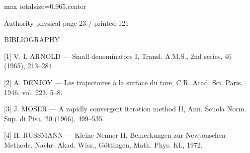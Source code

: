 \documentclass{article}
\begin{document}
\newpage
\noindent\begin{adjustbox}{max totalsize={\textwidth}{0.965\textheight},center}\begin{minipage}{\textwidth}
\noindent\hfill\scriptsize Authority physical page 23 / printed 121\par\normalsize
BIBLIOGRAPHY

[1] V. I. ARNOLD — Small denominators I, Transl. A.M.S., 2nd series, 46 (1965), 213–284.

[2] A. DENJOY — Les trajectoires à la surface du tore, C.R. Acad. Sci. Paris, 1946, vol. 223, 5–8.

[3] J. MOSER — A rapidly convergent iteration method II, Ann. Scuola Norm. Sup. di Pisa, 20 (1966), 499–535.

[4] H. RÜSSMANN — Kleine Nenner II, Bemerkungen zur Newtonschen Methode. Nachr. Akad. Wiss., Göttingen, Math. Phys. Kl., 1972.
\end{minipage}\end{adjustbox}
\end{document}

